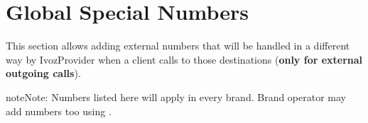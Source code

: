 \documentclass[letterpaper,10pt,english]{sphinxmanual}
\begin{document}
\section{Global Special Numbers}
\label{administration_portal/platform/global_special_numbers:global-special-numbers}\label{administration_portal/platform/global_special_numbers::doc}\label{administration_portal/platform/global_special_numbers:id1}
This section allows adding external numbers that will be handled in a different way by IvozProvider when a client
calls to those destinations (\textbf{only for external outgoing calls}).

\begin{notice}{note}{Note:}
Numbers listed here will apply in every brand. Brand operator may add numbers too using {\hyperref[administration_portal/brand/settings/special_numbers:special\string-numbers]{}}.
\end{notice}
\end{document}
